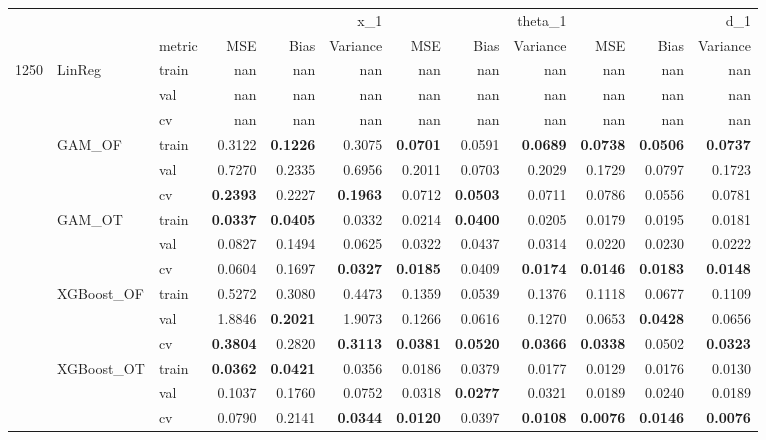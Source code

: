 \begin{tabular}{lllrrrrrrrrr}
 &  &  & \multicolumn{3}{r}{x_1} & \multicolumn{3}{r}{theta_1} & \multicolumn{3}{r}{d_1} \\
 &  & metric & MSE & Bias & Variance & MSE & Bias & Variance & MSE & Bias & Variance \\
\multirow[c]{15}{*}{1250} & \multirow[c]{3}{*}{LinReg} & train & nan & nan & nan & nan & nan & nan & nan & nan & nan \\
 &  & val & nan & nan & nan & nan & nan & nan & nan & nan & nan \\
 &  & cv & nan & nan & nan & nan & nan & nan & nan & nan & nan \\
 & \multirow[c]{3}{*}{GAM_OF} & train & 0.3122 & \bfseries 0.1226 & 0.3075 & \bfseries 0.0701 & 0.0591 & \bfseries 0.0689 & \bfseries 0.0738 & \bfseries 0.0506 & \bfseries 0.0737 \\
 &  & val & 0.7270 & 0.2335 & 0.6956 & 0.2011 & 0.0703 & 0.2029 & 0.1729 & 0.0797 & 0.1723 \\
 &  & cv & \bfseries 0.2393 & 0.2227 & \bfseries 0.1963 & 0.0712 & \bfseries 0.0503 & 0.0711 & 0.0786 & 0.0556 & 0.0781 \\
 & \multirow[c]{3}{*}{GAM_OT} & train & \bfseries 0.0337 & \bfseries 0.0405 & 0.0332 & 0.0214 & \bfseries 0.0400 & 0.0205 & 0.0179 & 0.0195 & 0.0181 \\
 &  & val & 0.0827 & 0.1494 & 0.0625 & 0.0322 & 0.0437 & 0.0314 & 0.0220 & 0.0230 & 0.0222 \\
 &  & cv & 0.0604 & 0.1697 & \bfseries 0.0327 & \bfseries 0.0185 & 0.0409 & \bfseries 0.0174 & \bfseries 0.0146 & \bfseries 0.0183 & \bfseries 0.0148 \\
 & \multirow[c]{3}{*}{XGBoost_OF} & train & 0.5272 & 0.3080 & 0.4473 & 0.1359 & 0.0539 & 0.1376 & 0.1118 & 0.0677 & 0.1109 \\
 &  & val & 1.8846 & \bfseries 0.2021 & 1.9073 & 0.1266 & 0.0616 & 0.1270 & 0.0653 & \bfseries 0.0428 & 0.0656 \\
 &  & cv & \bfseries 0.3804 & 0.2820 & \bfseries 0.3113 & \bfseries 0.0381 & \bfseries 0.0520 & \bfseries 0.0366 & \bfseries 0.0338 & 0.0502 & \bfseries 0.0323 \\
 & \multirow[c]{3}{*}{XGBoost_OT} & train & \bfseries 0.0362 & \bfseries 0.0421 & 0.0356 & 0.0186 & 0.0379 & 0.0177 & 0.0129 & 0.0176 & 0.0130 \\
 &  & val & 0.1037 & 0.1760 & 0.0752 & 0.0318 & \bfseries 0.0277 & 0.0321 & 0.0189 & 0.0240 & 0.0189 \\
 &  & cv & 0.0790 & 0.2141 & \bfseries 0.0344 & \bfseries 0.0120 & 0.0397 & \bfseries 0.0108 & \bfseries 0.0076 & \bfseries 0.0146 & \bfseries 0.0076 \\

\end{tabular}
